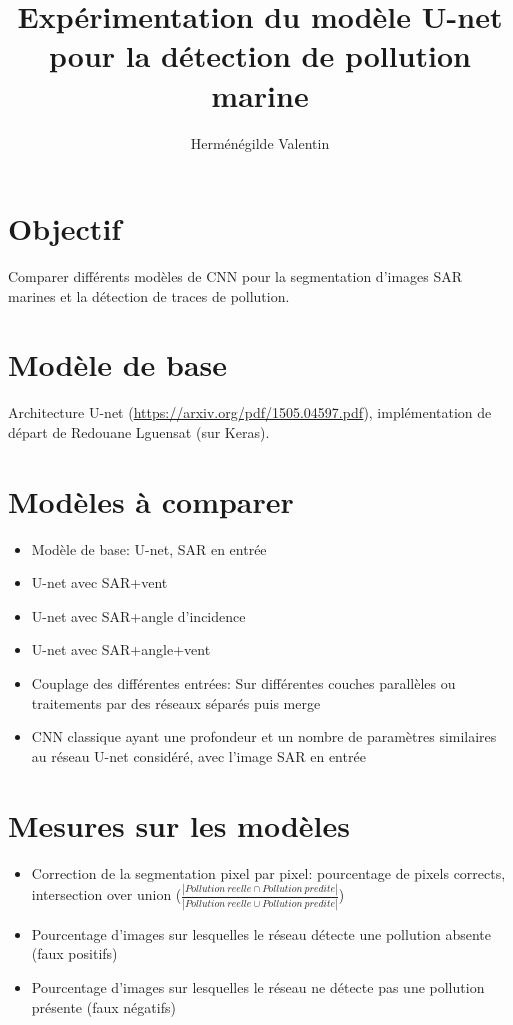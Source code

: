 \documentclass{article}
\begin{document}
\title{Expérimentation du modèle U-net pour la détection de pollution marine}
\author{Herménégilde Valentin}

\maketitle

\section{Objectif}
Comparer différents modèles de CNN pour la segmentation d'images SAR marines et la détection de traces de pollution.

\section{Modèle de base}
Architecture U-net (\hyperlink{https://arxiv.org/pdf/1505.04597.pdf}{https://arxiv.org/pdf/1505.04597.pdf}), implémentation de départ de Redouane Lguensat (sur Keras).

\section{Modèles à comparer}

\begin{itemize}
\item Modèle de base: U-net, SAR en entrée
\item U-net avec SAR+vent
\item U-net avec SAR+angle d'incidence
\item U-net avec SAR+angle+vent
\item Couplage des différentes entrées: Sur différentes couches parallèles ou traitements par des réseaux séparés puis merge
\item CNN classique ayant une profondeur et un nombre de paramètres similaires au réseau U-net considéré, avec l'image SAR en entrée
\end{itemize}

\section{Mesures sur les modèles}

\begin{itemize}
\item Correction de la segmentation pixel par pixel: pourcentage de pixels corrects, intersection over union ($\frac{\left\vert Pollution\ reelle \cap Pollution\ predite \right\vert}{\left\vert Pollution\ reelle \cup Pollution\ predite\right\vert}$)
\item Pourcentage d'images sur lesquelles le réseau détecte une pollution absente (faux positifs)
\item Pourcentage d'images sur lesquelles le réseau ne détecte pas une pollution présente (faux négatifs)
\end{itemize}
\end{document}
